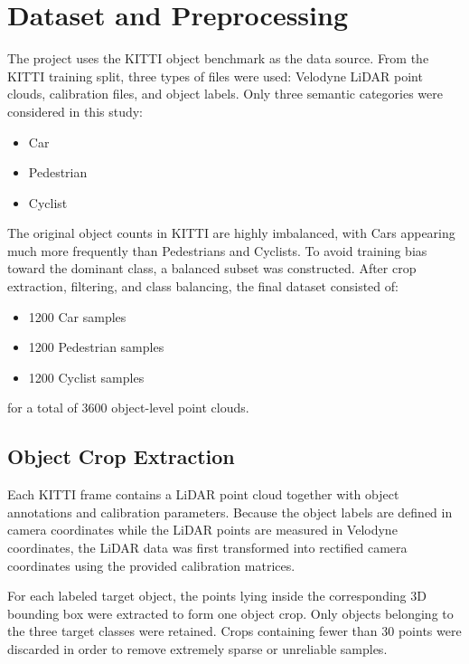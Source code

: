 \documentclass[12pt]{article}
\begin{document}
\section{Dataset and Preprocessing}

The project uses the KITTI object benchmark as the data source. From the KITTI training split, three types of files were used: Velodyne LiDAR point clouds, calibration files, and object labels. Only three semantic categories were considered in this study:

\begin{itemize}
    \item Car
    \item Pedestrian
    \item Cyclist
\end{itemize}

The original object counts in KITTI are highly imbalanced, with Cars appearing much more frequently than Pedestrians and Cyclists. To avoid training bias toward the dominant class, a balanced subset was constructed. After crop extraction, filtering, and class balancing, the final dataset consisted of:

\begin{itemize}
    \item 1200 Car samples
    \item 1200 Pedestrian samples
    \item 1200 Cyclist samples
\end{itemize}

for a total of 3600 object-level point clouds.

\subsection{Object Crop Extraction}

Each KITTI frame contains a LiDAR point cloud together with object annotations and calibration parameters. Because the object labels are defined in camera coordinates while the LiDAR points are measured in Velodyne coordinates, the LiDAR data was first transformed into rectified camera coordinates using the provided calibration matrices.

For each labeled target object, the points lying inside the corresponding 3D bounding box were extracted to form one object crop. Only objects belonging to the three target classes were retained. Crops containing fewer than 30 points were discarded in order to remove extremely sparse or unreliable samples.
\end{document}

